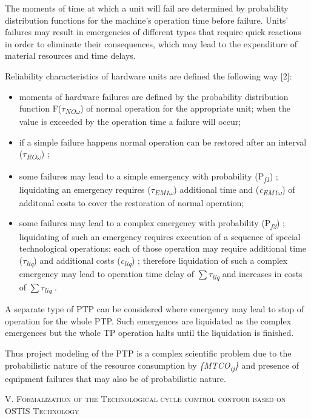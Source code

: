 \documentclass{article}
\begin{document}
\begin{minipage}[t]{0.45\textwidth}
    The moments of time at which a unit will fail are determined by probability distribution functions for the machine’s operation time before failure. Units’ failures may result in emergencies of different types that require quick reactions in order to eliminate their consequences, which may lead to the expenditure of material resources and time delays.

    \hspace{0.2cm} Reliability characteristics of hardware units are defined the following way [2]:
\begin{itemize}[noitemsep,topsep=2pt]
    \item  moments of hardware failures are defined by the probability distribution function F($\tau$\textit{\textsubscript{NO$\omega$}}) of normal operation for the appropriate unit; when the value is exceeded by the operation time a failure will occur;
    \item if a simple failure happens normal operation can be restored after an interval ($\tau$\textit{\textsubscript{RO$\omega$}}) ;
    \item some failures may lead to a simple emergency with probability (P\textit{\textsubscript{f1}}) ; liquidating an emergency requires ($\tau$\textit{\textsubscript{EM1$\omega$}}) additional time and (\textit{c\textsubscript{EM1$\omega$}}) of additonal costs to cover the restoration of normal operation;
    \item some failures may lead to a complex emergency with probability (P\textit{\textsubscript{f2}}) ; liquidating of such an emergency requires execution of a sequence of special technological operations; each of those operation may require additional time ($\tau$\textit{\textsubscript{liq}}) and additional costs (\textit{c\textsubscript{liq}}) ; therefore liquidation of such a complex emergency may lead to operation time delay of $\sum$$\tau$\textit{\textsubscript{liq}} and increases in costs of $\sum$$\tau$\textit{\textsubscript{liq}} .
\end{itemize}
    \vspace{0.3\baselineskip} \hspace{0.2cm} A separate type of PTP can be considered where emergency may lead to stop of operation for the whole PTP. Such emergences are liquidated as the complex emergences but the whole TP operation halts until the liquidation is finished.

    \hspace{0.2cm} Thus project modeling of the PTP is a complex scientific problem due to the probabilistic nature of the resource consumption by \textit{\{MTCO\textsubscript{ij}\}} and presence of equipment failures that may also be of probabilistic nature.
\begin{center}
    \vspace{0.4\baselineskip} \textsc{V. Formalization of the Technological cycle  control contour based on OSTIS Technology}
\end{center}
    

\end{minipage}
\end{document}

